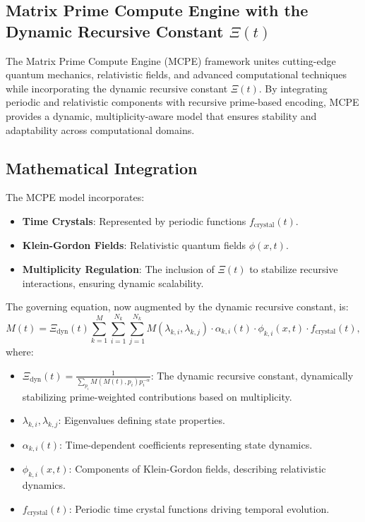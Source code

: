 \documentclass{article}
\theoremstyle{plain}
\begin{document}
\begin{itemize}
\section{Matrix Prime Compute Engine with the Dynamic Recursive Constant \(\Xi(t) \)}

The Matrix Prime Compute Engine (MCPE) framework unites cutting-edge quantum mechanics, relativistic fields, and advanced computational techniques while incorporating the dynamic recursive constant \(\Xi(t) \). By integrating periodic and relativistic components with recursive prime-based encoding, MCPE provides a dynamic, multiplicity-aware model that ensures stability and adaptability across computational domains.

\subsection{Mathematical Integration}
The MCPE model incorporates:
\begin{itemize}
    \item \textbf{Time Crystals}: Represented by periodic functions \( f_{\text{crystal}}(t) \).
    \item \textbf{Klein-Gordon Fields}: Relativistic quantum fields \( \phi(x, t) \).
    \item \textbf{Multiplicity Regulation}: The inclusion of \(\Xi(t) \) to stabilize recursive interactions, ensuring dynamic scalability.
\end{itemize}
The governing equation, now augmented by the dynamic recursive constant, is:
\begin{equation}
M(t) = \Xi_{\text{dyn}}(t) \sum_{k=1}^M \sum_{i=1}^{N_k} \sum_{j=1}^{N_k} M(\lambda_{k,i}, \lambda_{k,j}) \cdot \alpha_{k,i}(t) \cdot \phi_{k,i}(x,t) \cdot f_{\text{crystal}}(t),
\end{equation}
where:
\begin{itemize}
    \item \( \Xi_{\text{dyn}}(t) = \frac{1}{\sum_{p_i} M(M(t), p_i) p_i^{-\alpha}} \): The dynamic recursive constant, dynamically stabilizing prime-weighted contributions based on multiplicity.
    \item \( \lambda_{k,i}, \lambda_{k,j} \): Eigenvalues defining state properties.
    \item \( \alpha_{k,i}(t) \): Time-dependent coefficients representing state dynamics.
    \item \( \phi_{k,i}(x,t) \): Components of Klein-Gordon fields, describing relativistic dynamics.
    \item \( f_{\text{crystal}}(t) \): Periodic time crystal functions driving temporal evolution.
\end{itemize}


\end{itemize}
\end{document}
